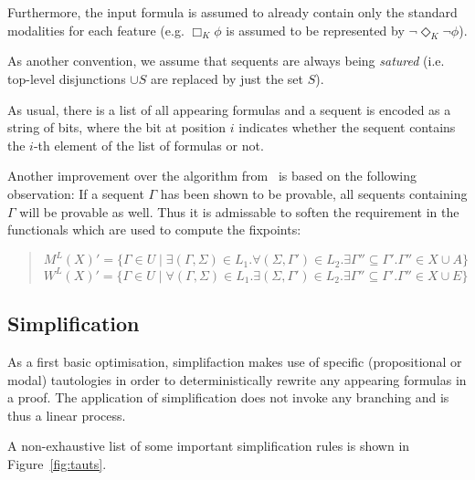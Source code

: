 \documentclass{llncs}
\begin{document}
\noindent Furthermore, the input formula is assumed to already contain only the standard modalities
for each feature (e.g. $\Box_K\phi$ is assumed to be represented by $\neg\Diamond_K\neg\phi$).

\noindent As another convention, we assume that sequents are always being \emph{satured}
(i.e. top-level disjunctions $\cup S$ are replaced by just the set $S$).

\noindent As usual, there is a list of all appearing formulas and a sequent is encoded as a string of
bits, where the bit at position $i$ indicates whether the sequent contains the $i$-th element of the list
of formulas or not.

\noindent Another improvement over the algorithm from~\cite{GoreEA10} is based on the following
observation: If a sequent $\Gamma$ has been shown to be provable, all sequents containing $\Gamma$ will
be provable as well. Thus it is admissable to soften the requirement in the functionals which are used to
compute the fixpoints:
\begin{quote}
$M^L(X)'=\{\Gamma\in U\mid\exists(\Gamma,\Sigma)\in L_1.\forall (\Sigma,\Gamma')\in L_2. \exists \Gamma''\subseteq \Gamma'.\Gamma''\in X\cup A\}$\\
$W^L(X)'=\{\Gamma\in U\mid\forall(\Gamma,\Sigma)\in L_1.\exists (\Sigma,\Gamma')\in L_2. \exists \Gamma''\subseteq \Gamma'.\Gamma''\in X\cup E\}$\\
\end{quote}


\subsection{Simplification}

As a first basic optimisation, simplifaction makes use of specific (propositional or modal)
tautologies in order to deterministically rewrite any appearing formulas in a proof.
The application of simplification does not invoke any branching and is thus a
linear process.

\noindent A non-exhaustive list of some important simplification rules is shown in
Figure~\ref{fig:tauts}.
\end{document}
